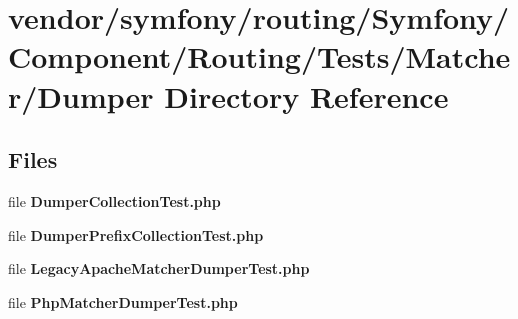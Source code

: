 \section{vendor/symfony/routing/\+Symfony/\+Component/\+Routing/\+Tests/\+Matcher/\+Dumper Directory Reference}
\label{dir_2d7af0855c984c88b7a1e166c955e793}
\subsection*{Files}
\begin{DoxyCompactItemize}
\item 
file {\bf Dumper\+Collection\+Test.\+php}
\item 
file {\bf Dumper\+Prefix\+Collection\+Test.\+php}
\item 
file {\bf Legacy\+Apache\+Matcher\+Dumper\+Test.\+php}
\item 
file {\bf Php\+Matcher\+Dumper\+Test.\+php}
\end{DoxyCompactItemize}
